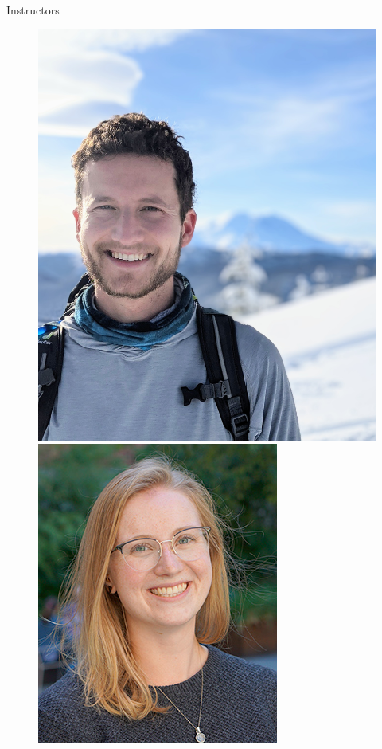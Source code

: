 \documentclass{beamer}
\begin{document}
\begin{frame}{Instructors}
\begin{figure}
	\begin{center}
		\includegraphics[height=0.4\textheight]{charlie.jpg} 
		\hspace{2cm}
		\includegraphics[height=0.4\textheight]{taylor.jpg}
	\end{center}
\end{figure}


\end{frame}
\end{document}
